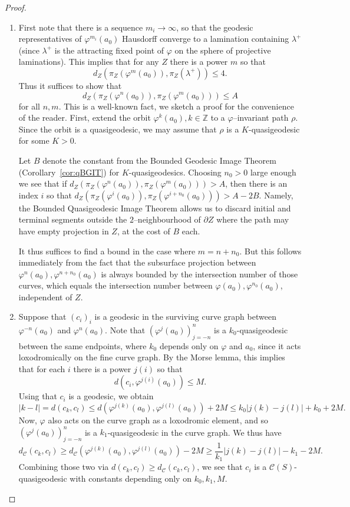 \documentclass{amsart}
\newcommand{\C}{\mathcal{C}}
\newcommand{\dist}{d}
\theoremstyle{definition}
\begin{document}
\begin{proof}
  \begin{enumerate}
  \item First note that there is a sequence $m_i\to \infty$, so that
    the geodesic representatives of $\varphi^{m_i}(a_0)$ Hausdorff
    converge to a lamination containing $\lambda^+$ (since $\lambda^+$
    is the attracting fixed point of $\varphi$ on the sphere of
    projective laminations). This implies that for any $Z$ there is a
    power $m$ so that
    \[ \dist_Z(\pi_Z(\varphi^m(a_0)), \pi_Z(\lambda^+)) \leq 4. \] 
      Thus it suffices to show that
    \[\dist_Z(\pi_Z(\varphi^n(a_0)),\pi_Z(\varphi^m(a_0)))\leq A\]
    for all $n,m$. This is a well-known fact, we sketch a proof for
    the convenience of the reader. First, extend the
    orbit $\varphi^k(a_0), k\in\mathbb{Z}$ to a $\varphi$--invariant
    path $\rho$. Since the orbit is a quasigeodesic, we may assume
    that $\rho$ is a $K$-quasigeodesic for some $K>0$.

	Let $B$ denote the constant from the Bounded Geodesic Image Theorem (Corollary~\ref{cor:qBGIT}) for $K$-quasigeodesics.
    Choosing $n_0 > 0$ large enough we see that if
    $\dist_Z(\pi_Z(\varphi^n(a_0)),\pi_Z(\varphi^m(a_0)))> A$, then
    there is an index $i$ so that
    $\dist_Z(\pi_Z(\varphi^i(a_0)),\pi_Z(\varphi^{i+n_0}(a_0)))>
    A-2B$. Namely, the Bounded Quasigeodesic Image Theorem
    allows us to discard initial and
    terminal segments outside the $2$--neighbourhood of $\partial Z$ where the path may 	have empty projection in $Z$, at the cost of $B$ each.

    It thus suffices to find a bound in the case where 
    $m=n+n_0$. But this follows immediately from the fact that the
    subsurface projection between $\varphi^n(a_0), \varphi^{n+n_0}(a_0)$ is always
    bounded by the intersection number of those curves, which equals the intersection 	
    number between $\varphi(a_0), \varphi^{n_0}(a_0)$, independent of $Z$.
  \item Suppose that $(c_i)_i$ is a geodesic in the surviving
    curve graph between \(\varphi^{-n}(a_0)\) and
    \(\varphi^n(a_0)\). Note that $(\varphi^j(a_0))_{j=-n}^n$ is
    a $k_0$-quasigeodesic between the same endpoints, where $k_0$
    depends only on $\varphi$ and $a_0$, since it acts loxodromically on the
    fine curve graph. By the Morse lemma, this implies that for each
    $i$ there is a power $j(i)$ so that
    \[ \dist(c_i, \varphi^{j(i)}(a_0)) \leq M. \]
    Using that $c_i$ is a geodesic, we obtain
    \[ |k - l| = \dist(c_k, c_l) \leq
      d(\varphi^{j(k)}(a_0), \varphi^{j(l)}(a_0)) + 2M \leq
      k_0|j(k)-j(l)| + k_0 + 2M. \] Now, $\varphi$ also acts on the
    curve graph as a loxodromic element, and so
    $(\varphi^j(a_0))_{j=-n}^n$ is a $k_1$-quasigeodesic in the
    curve graph. We thus have
    \[ \dist_\C(c_k,c_l) \geq \dist_\C(\varphi^{j(k)}(a_0),
      \varphi^{j(l)}(a_0)) - 2M \geq \frac{1}{k_1}|j(k)-j(l)| - k_1 -
      2M. \] Combining those two via $d(c_k,c_l) \geq d_\C(c_k,c_l)$, we see that $c_i$ is a
    \(\C(S)\)-quasigeodesic with constants depending only on $k_0,k_1,M$.


\end{enumerate}
\end{proof}
\end{document}
